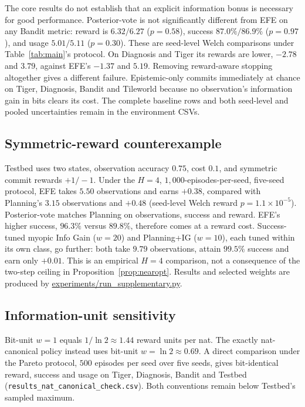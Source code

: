 \documentclass[manuscript, screen, review]{jair}
\begin{document}
The core results do not establish that an explicit information bonus is necessary for good performance. Posterior-vote is not significantly different from EFE on any Bandit metric: reward is $6.32/6.27$ ($p=0.58$), success $87.0\%/86.9\%$ ($p=0.97$), and usage $5.01/5.11$ ($p=0.30$). These are seed-level Welch comparisons under Table~\ref{tab:main}'s protocol. On Diagnosis and Tiger its rewards are lower, $-2.78$ and $3.79$, against EFE's $-1.37$ and $5.19$. Removing reward-aware stopping altogether gives a different failure. Epistemic-only commits immediately at chance on Tiger, Diagnosis, Bandit and Tileworld because no observation's information gain in bits clears its cost. The complete baseline rows and both seed-level and pooled uncertainties remain in the environment CSVs.

\subsection{Symmetric-reward counterexample}
\label{app:testbed}

Testbed uses two states, observation accuracy $0.75$, cost $0.1$, and symmetric commit rewards $+1/{-}1$. Under the $H=4$, $1{,}000$-episodes-per-seed, five-seed protocol, EFE takes $5.50$ observations and earns $+0.38$, compared with Planning's $3.15$ observations and $+0.48$ (seed-level Welch reward $p=1.1\times10^{-5}$). Posterior-vote matches Planning on observations, success and reward. EFE's higher success, $96.3\%$ versus $89.8\%$, therefore comes at a reward cost. Success-tuned myopic Info Gain ($w=20$) and Planning+IG ($w=10$), each tuned within its own class, go further: both take $9.79$ observations, attain $99.5\%$ success and earn only $+0.01$. This is an empirical $H=4$ comparison, not a consequence of the two-step ceiling in Proposition~\ref{prop:nearopt}. Results and selected weights are produced by \url{experiments/run_supplementary.py}.

\subsection{Information-unit sensitivity}
\label{app:nat_canonical}

Bit-unit $w=1$ equals $1/\ln2\approx1.44$ reward units per nat. The exactly nat-canonical policy instead uses bit-unit $w=\ln2\approx0.69$. A direct comparison under the Pareto protocol, $500$ episodes per seed over five seeds, gives bit-identical reward, success and usage on Tiger, Diagnosis, Bandit and Testbed (\texttt{results\_nat\_canonical\_check.csv}). Both conventions remain below Testbed's sampled maximum.
\end{document}

